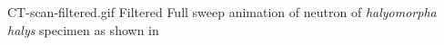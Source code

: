 \documentclass[../main.tex]{subfiles}%
\begin{document}
%
    \Xsupplement%
    \begin{supplement}%
        \supplementcaption%
            {CT-scan-filtered.gif}%
            {Filtered }%
            {Full sweep animation of neutron  of \textit{halyomorpha halys} specimen as shown in }%
        \label{sup:ct-scan-filtered}%
    \end{supplement}%
\end{document}

